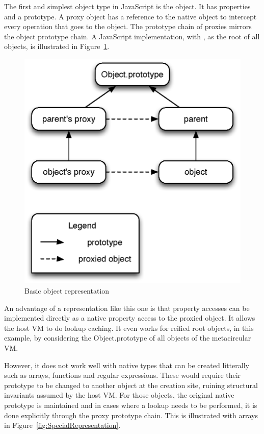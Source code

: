 The first and simplest object type in JavaScript is the object. It has
properties and a prototype. A proxy object has a reference to the native object
to intercept every operation that goes to the object. The prototype chain of
proxies mirrors the object prototype chain. A JavaScript implementation, with
, as the root of all objects, is illustrated in
Figure~\ref{fig:BasicRepresentation}.

\begin{figure}[htb]
\begin{center}
\includegraphics[scale=0.75]{figures/objectRepresentation}
\caption{\label{fig:BasicRepresentation} Basic object representation}
\end{center}
\end{figure}

An advantage of a representation like this one is that property accesses can be
implemented directly as a native property access to the proxied object. It
allows the host VM to do lookup caching. It even works for reified root
objects, in this example, by considering  the {Object.prototype} of
all objects of the metacircular VM.

However, it does not work well with native types that can be created litterally
such as arrays, functions and regular expressions. These would require their
prototype to be changed to another object at the creation site, ruining
structural invariants assumed by the host VM. For those objects, the original
native prototype is maintained and in cases where a lookup needs to be
performed, it is done explicitly through the proxy prototype chain. This is
illustrated with arrays in Figure~\ref{fig:SpecialRepresentation}.

